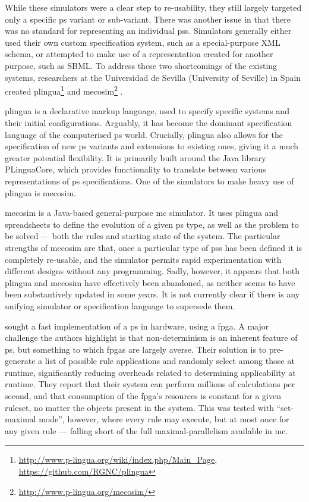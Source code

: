 While these simulators were a clear step to re-usability, they still largely targeted only a specific \gls{ps} variant or sub-variant.  There was another issue in that there was no standard for representing an individual \glspl{ps}.  Simulators generally either used their own custom specification system, such as a special-purpose XML schema, or attempted to make use of a representation created for another purpose, such as SBML.  To address these two shortcomings of the existing systems, researchers at the Universidad de Sevilla (University of Seville) in Spain created \gls{plingua}\footnote{\url{http://www.p-lingua.org/wiki/index.php/Main_Page}, \url{https://github.com/RGNC/plingua}} \cite{Diaz-Pernil2008a,Garcia-Quismondo2010} and \gls{mecosim}\footnote{\url{http://www.p-lingua.org/mecosim/}} \cite{Perez-Hurtado2010}.

\Gls{plingua} is a declarative markup language, used to specify specific systems and their initial configurations.  Arguably, it has become the dominant specification language of the computerised \gls{ps} world.  Crucially, \gls{plingua} also allows for the specification of new \gls{ps} variants and extensions to existing ones, giving it a much greater potential flexibility.  It is primarily built around the Java library PLinguaCore, which provides functionality to translate between various representations of \gls{ps} specifications.  One of the simulators to make heavy use of \gls{plingua} is \gls{mecosim}.

\Gls{mecosim} is a Java-based general-purpose \gls{mc} simulator.  It uses \gls{plingua} and spreadsheets to define the evolution of a given \gls{ps} type, as well as the problem to be solved --- both the rules and starting state of the system.  The particular strengths of \gls{mecosim} are that, once a particular type of \glspl{ps} has been defined it is completely re-usable, and the simulator permits rapid experimentation with different designs without any programming.  Sadly, however, it appears that both \gls{plingua} and \gls{mecosim} have effectively been abandoned, as neither seems to have been substantively updated in some years.  It is not currently clear if there is any unifying simulator or specification language to supersede them.

\citeauthor{Verlan2012} \cite{Verlan2012} sought a fast implementation of a \gls{ps} in hardware, using a \gls{fpga}.  A major challenge the authors highlight is that non-determinism is an inherent feature of \gls{ps}, but something to which \glspl{fpga} are largely averse.  Their solution is to pre-generate a list of possible rule applications and randomly select among those at runtime, significantly reducing overheads related to determining applicability at runtime.  They report that their system can perform millions of calculations per second, and that consumption of the \gls{fpga}'s resources is constant for a given ruleset, no matter the objects present in the system.  This was tested with ``set-maximal mode'', however, where every rule may execute, but at most once for any given rule --- falling short of the full maximal-parallelism available in \gls{mc}.

